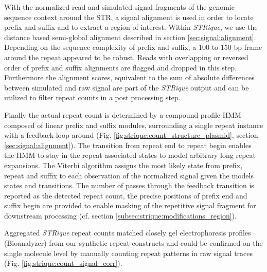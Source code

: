 With the normalized read and simulated signal fragments of the genomic sequence context around the STR, a signal alignment is used in order to locate prefix and suffix and to extract a region of interest. Within \textit{STRique}, we use the distance based semi-global alignment described in section \ref{sec:signal:alignment}. Depending on the sequence complexity of prefix and suffix, a 100 to 150 bp frame around the repeat appeared to be robust. Reads with overlapping or reversed order of prefix and suffix alignments are flagged and dropped in this step. Furthermore the alignment scores, equivalent to the sum of absolute differences between simulated and raw signal are part of the \textit{STRique} output and can be utilized to filter repeat counts in a post processing step.

Finally the actual repeat count is determined by a compound profile HMM composed of linear prefix and suffix modules, surrounding a single repeat instance with a feedback loop around (Fig. \ref{fig:strique:count_structure_plasmid}, section \ref{sec:signal:alignment}). The transition from repeat end to repeat begin enables the HMM to stay in the repeat associated states to model arbitrary long repeat expansions. The Viterbi algorithm assigns the most likely state from prefix, repeat and suffix to each observation of the normalized signal given the models states and transitions. The number of passes through the feedback transition is reported as the detected repeat count, the precise positions of prefix end and suffix begin are provided to enable masking of the repetitive signal fragment for downstream processing (cf. section \ref{subsec:strique:modifications_region}).

Aggregated \textit{STRique} repeat counts matched closely gel electrophoresis profiles (Bioanalyzer) from our synthetic repeat constructs and could be confirmed on the single molecule level by manually counting repeat patterns in raw signal traces (Fig. \ref{fig:strique:count_signal_corr}).

